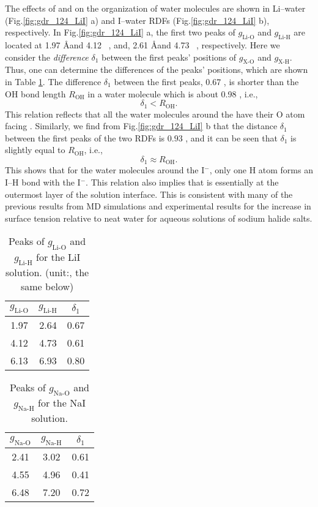 The effects of \Li and \I on the organization of water molecules are shown in Li--water (Fig.\thinspace\ref{fig:gdr_124_LiI} a) 
and I--water RDFs (Fig.\thinspace\ref{fig:gdr_124_LiI} b), respectively.  
In Fig.\thinspace\ref{fig:gdr_124_LiI} a, the first two peaks of $g_{\text{Li-O}}$ and $g_{\text{Li-H}}$ are located at 1.97 \AA and 4.12 \ \A,  
and, 2.61 \AA and 4.73 \ \A, respectively. 
Here we consider the \emph{difference} $\delta_1$ between the first peaks' positions of $g_{\text{X-O}}$ and $g_{\text{X-H}}$. 
Thus, one can determine the differences of the peaks' positions, which are shown in Table \ref{tab:gdr_Li-water}. 
The difference $\delta_1$ between the first peaks, 0.67 \A, is shorter than the OH bond length $R_{\text{OH}}$ in a water molecule which is about 0.98 \A, i.e.,
\begin{equation}
\delta_1 < R_{\text{OH}}.
\label{lt_OH}
\end{equation}
This relation reflects that all the water molecules around the \Li have their O atom facing \li. 
Similarly, we find from Fig.\thinspace\ref{fig:gdr_124_LiI} b that the distance $\delta_1$ between the first peaks of the 
two RDFs is $0.93$ \A, and it can be seen that $\delta_1$ is slightly equal to $R_{\text{OH}}$, i.e., 
\begin{equation}
\delta_1 \approx R_{\text{OH}}.
\label{almost_OH}
\end{equation}
This shows that for the water molecules around the I$^-$, only one H atom forms an I--H bond with the I$^-$. 
This relation also implies that \I is essentially at the outermost layer of the solution interface. 
This is consistent with many of the previous results from MD simulations \cite{Dang2002,Jungwirth2001} 
and experimental results for the increase in surface tension relative to neat water for aqueous solutions of sodium halide salts\cite{Jungwirth2002,Vrbka2004,Garrett2004,Bajaj2016}.
\begin{table}[htbp] %
\centering
\caption{\label{tab:gdr_Li-water} 
Peaks of $g_{\text{Li-O}}$ and $g_{\text{Li-H}}$ for the LiI solution. (unit:\A, the same below)}
\begin{tabular}{ccc} %
  $g_{\text{Li-O}}$& $g_{\text{Li-H}}$ & $\delta_1$  \\
\hline
 1.97 & 2.64 & 0.67 \\
 4.12&4.73  &0.61  \\
 6.13 &6.93 & 0.80 
\end{tabular}
\end{table}
\begin{table}[htbp] %
  \centering
  \caption{\label{tab:gdr_Na-water} 
  Peaks of $g_{\text{Na-O}}$ and $g_{\text{Na-H}}$ for the NaI solution.}
  \begin{tabular}{ccc} %
    $g_{\text{Na-O}}$& $g_{\text{Na-H}}$ & $\delta_1$  \\
  \hline
   2.41 & 3.02 & 0.61 \\
   4.55 & 4.96  &0.41  \\
   6.48 & 7.20 & 0.72 
  \end{tabular}
\end{table}
